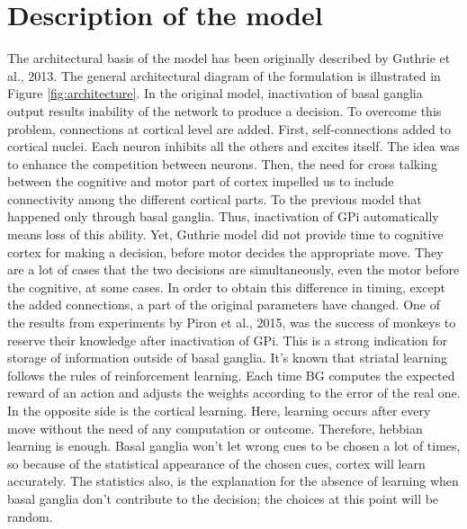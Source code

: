 \section{Description of the model}

	The architectural basis of the model has been originally described by Guthrie et al., 2013. The general architectural diagram of the formulation is illustrated in Figure \ref{fig:architecture}. In the original model, inactivation of basal ganglia output results inability of the network to produce a decision. To overcome this problem, connections at cortical level are added. 
	First, self-connections added to cortical nuclei. Each neuron inhibits all the others and excites itself. The idea was to enhance the competition between neurons.
	Then, the need for cross talking between the cognitive and motor part of cortex impelled us to include connectivity among the different cortical parts. To the previous model that happened only through basal ganglia. Thus, inactivation of GPi automatically means loss of this ability. 
	Yet,  Guthrie model did not provide time to cognitive cortex for making a decision, before motor  decides the appropriate move. They are a lot of cases that the two decisions are simultaneously, even the motor before the cognitive, at some cases. In order to obtain this difference in timing, except the added connections, a part of the original parameters have changed. 
	One of the results from experiments by Piron et al., 2015, was the success of monkeys to reserve their knowledge after inactivation of GPi. This is a strong indication for storage of information outside of basal ganglia. It's known that striatal learning follows the rules of reinforcement learning. Each time BG computes the expected reward of an action and adjusts the weights according to the error of the real one. In the opposite side is the cortical learning. Here, learning occurs after every move without the need of any computation or outcome. Therefore, hebbian learning is enough. Basal ganglia won't let wrong cues to be chosen a lot of times, so because of the statistical appearance of the chosen cues, cortex will learn accurately.  The statistics also, is the explanation for the absence of learning when basal ganglia don't contribute to the decision; the choices at this point will be random.